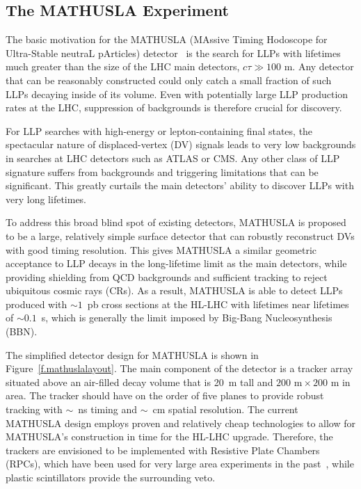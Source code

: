 \subsection{The MATHUSLA Experiment}
\label{sec:MATHUSLA}


The basic motivation for the MATHUSLA (MAssive Timing Hodoscope for Ultra-Stable neutraL pArticles) detector~\cite{Chou:2016lxi} is the search for LLPs with lifetimes much greater than the size of the LHC main detectors, $c \tau \gg 100$ m.
%
Any detector that can be reasonably constructed could only catch a small fraction of such LLPs decaying inside of its volume.
%
Even with potentially large LLP production rates at the LHC, suppression of backgrounds is therefore crucial for discovery.

For LLP searches with high-energy or lepton-containing final states, the spectacular nature of displaced-vertex (DV) signals leads to very low backgrounds in searches at LHC detectors such as ATLAS or CMS.
%
Any other class of LLP signature suffers from backgrounds and triggering limitations that can be significant. This greatly curtails the main detectors' ability to discover LLPs with very long lifetimes.

To address this broad blind spot of existing detectors, MATHUSLA is proposed to be a large, relatively simple surface detector that can robustly reconstruct DVs with good timing resolution.
%
This gives MATHUSLA a similar geometric acceptance to LLP decays in the long-lifetime limit as the main detectors, while providing shielding from QCD backgrounds and sufficient tracking to reject ubiquitous cosmic rays (CRs).
%
As a result, MATHUSLA is able to detect LLPs produced with $\sim1$~pb cross sections at the HL-LHC with lifetimes near lifetimes of $\sim 0.1$~s, which is generally the limit imposed by Big-Bang Nucleosynthesis (BBN).

The simplified detector design for MATHUSLA is shown in Figure~\ref{f.mathuslalayout}.
%
The main component of the detector is a tracker array situated above an air-filled decay volume that is 20~m tall and $200\,\,\mathrm{m} \times 200\,\,\mathrm{m}$ in area. The tracker should have on the order of five planes to provide robust tracking with $\sim$~ns timing and $\sim$~cm spatial resolution.
%
The current MATHUSLA design employs proven and relatively cheap technologies to allow for MATHUSLA's construction in time for the HL-LHC upgrade. Therefore, the trackers are envisioned to be implemented with Resistive Plate Chambers (RPCs), which have been used for very large area experiments in the past~\cite{Aielli:2006cj, Iuppa:2015hna}, while plastic scintillators provide the surrounding veto.

